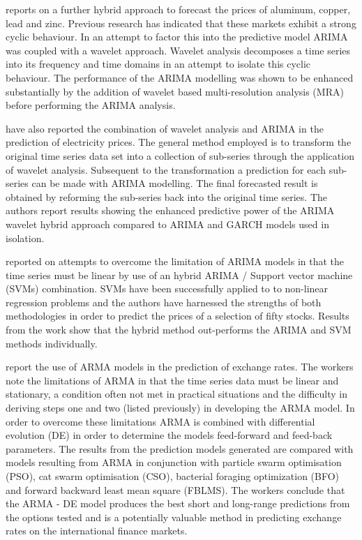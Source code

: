 \cite{Kriechbaumer201432} reports on a further hybrid approach to forecast the prices of aluminum, copper, lead and zinc. Previous research has indicated that these markets exhibit a strong cyclic behaviour. In an attempt to factor this into the predictive model ARIMA was coupled with a wavelet approach. Wavelet analysis decomposes a time series into its frequency and time domains in an attempt to isolate this cyclic behaviour. The performance of the ARIMA modelling was shown to be enhanced substantially by the addition of wavelet based multi-resolution analysis (MRA) before performing the ARIMA analysis.

\cite{Tan20103606} have also reported the combination of wavelet analysis and ARIMA in the prediction of electricity prices. The general method employed is to transform the original time series data set into a collection of sub-series through the application of wavelet analysis. Subsequent to the transformation a prediction for each sub-series can be made with ARIMA modelling. The final forecasted result is obtained by reforming the sub-series back into the original time series. The authors report results showing the enhanced predictive power of the ARIMA wavelet hybrid approach compared to ARIMA and GARCH models used in isolation.

\cite{Pai2005497} reported on attempts to overcome the limitation of ARIMA models in that the time series must be linear by use of an hybrid ARIMA / Support vector machine (SVMs) combination. SVMs have been successfully applied to to non-linear regression problems and the authors have harnessed the strengths of both methodologies in order to predict the prices of a selection of fifty stocks. Results from the work show that the hybrid method out-performs the ARIMA and SVM methods individually.

\cite{Rout20147} report the use of ARMA models in the prediction of exchange rates. The workers note the limitations of ARMA in that the time series data must be linear and stationary, a condition often not met in practical situations and the difficulty in deriving steps one and two (listed previously) in developing the ARMA model. In order to overcome these limitations ARMA is combined with differential evolution (DE) in order to determine the models feed-forward and feed-back parameters. The results from the prediction models generated are compared with models resulting from ARMA in conjunction with particle swarm optimisation (PSO), cat swarm optimisation (CSO), bacterial foraging optimization (BFO) and forward backward least mean square (FBLMS). The workers conclude that the ARMA - DE model produces the best short and long-range predictions from the options tested and is a potentially valuable method in predicting exchange rates on the international finance markets.

